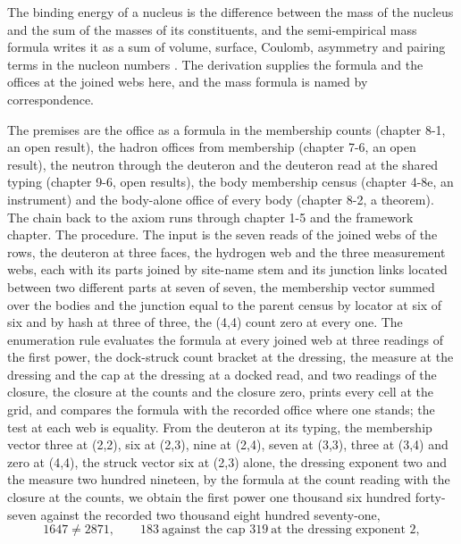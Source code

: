 \begin{chbridge}
The binding energy of a nucleus is the difference between the mass of the nucleus and the sum of the masses of its constituents, and the semi-empirical mass formula writes it as a sum of volume, surface, Coulomb, asymmetry and pairing terms in the nucleon numbers \cite{Weizsaecker1935,BetheBacher1936}. The derivation supplies the formula and the offices at the joined webs here, and the mass formula is named by correspondence.
\end{chbridge}
\begin{chproof}[finite]
The premises are the office as a formula in the membership counts (chapter 8-1, an open result), the hadron offices from membership (chapter 7-6, an open result), the neutron through the deuteron and the deuteron read at the shared typing (chapter 9-6, open results), the body membership census (chapter 4-8e, an instrument) and the body-alone office of every body (chapter 8-2, a theorem). The chain back to the axiom runs through chapter 1-5 and the framework chapter. The procedure. The input is the seven reads of the joined webs of the rows, the deuteron at three faces, the hydrogen web and the three measurement webs, each with its parts joined by site-name stem and its junction links located between two different parts at seven of seven, the membership vector summed over the bodies and the junction equal to the parent census by locator at six of six and by hash at three of three, the (4,4) count zero at every one. The enumeration rule evaluates the formula at every joined web at three readings of the first power, the dock-struck count bracket at the dressing, the measure at the dressing and the cap at the dressing at a docked read, and two readings of the closure, the closure at the counts and the closure zero, prints every cell at the grid, and compares the formula with the recorded office where one stands; the test at each web is equality. From the deuteron at its typing, the membership vector three at (2,2), six at (2,3), nine at (2,4), seven at (3,3), three at (3,4) and zero at (4,4), the struck vector six at (2,3) alone, the dressing exponent two and the measure two hundred nineteen, by the formula at the count reading with the closure at the counts, we obtain the first power one thousand six hundred forty-seven against the recorded two thousand eight hundred seventy-one,
\begin{equation}
1647 \neq 2871 , \qquad 183 \ \text{against the cap } 319 \ \text{at the dressing exponent } 2 ,
\end{equation}

\end{chproof}
